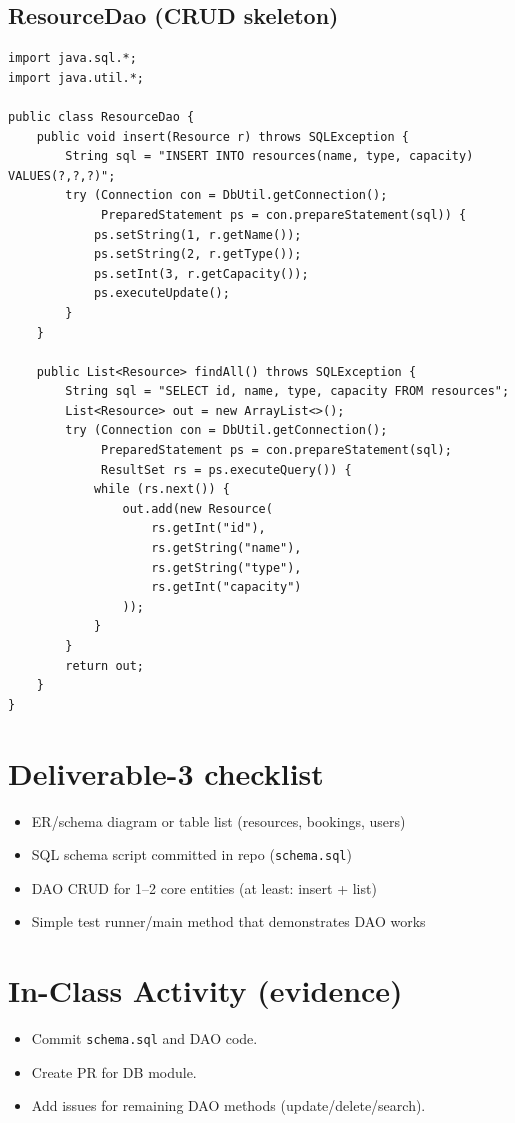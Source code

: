 \documentclass[11pt]{article}
\begin{document}
\subsection*{ResourceDao (CRUD skeleton)}
\begin{lstlisting}
import java.sql.*;
import java.util.*;

public class ResourceDao {
    public void insert(Resource r) throws SQLException {
        String sql = "INSERT INTO resources(name, type, capacity) VALUES(?,?,?)";
        try (Connection con = DbUtil.getConnection();
             PreparedStatement ps = con.prepareStatement(sql)) {
            ps.setString(1, r.getName());
            ps.setString(2, r.getType());
            ps.setInt(3, r.getCapacity());
            ps.executeUpdate();
        }
    }

    public List<Resource> findAll() throws SQLException {
        String sql = "SELECT id, name, type, capacity FROM resources";
        List<Resource> out = new ArrayList<>();
        try (Connection con = DbUtil.getConnection();
             PreparedStatement ps = con.prepareStatement(sql);
             ResultSet rs = ps.executeQuery()) {
            while (rs.next()) {
                out.add(new Resource(
                    rs.getInt("id"),
                    rs.getString("name"),
                    rs.getString("type"),
                    rs.getInt("capacity")
                ));
            }
        }
        return out;
    }
}
\end{lstlisting}

\section{Deliverable-3 checklist}
\begin{itemize}
  \item ER/schema diagram or table list (resources, bookings, users)
  \item SQL schema script committed in repo (\texttt{schema.sql})
  \item DAO CRUD for 1--2 core entities (at least: insert + list)
  \item Simple test runner/main method that demonstrates DAO works
\end{itemize}

\section{In-Class Activity (evidence)}
\begin{itemize}
  \item Commit \texttt{schema.sql} and DAO code.
  \item Create PR for DB module.
  \item Add issues for remaining DAO methods (update/delete/search).
\end{itemize}
\end{document}
